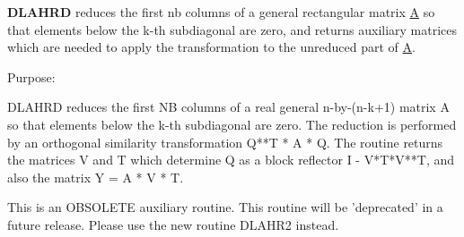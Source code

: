 {\bfseries D\+L\+A\+H\+R\+D} reduces the first nb columns of a general rectangular matrix \hyperlink{classA}{A} so that elements below the k-\/th subdiagonal are zero, and returns auxiliary matrices which are needed to apply the transformation to the unreduced part of \hyperlink{classA}{A}. 

 \begin{DoxyParagraph}{Purpose\+: }
\begin{DoxyVerb} DLAHRD reduces the first NB columns of a real general n-by-(n-k+1)
 matrix A so that elements below the k-th subdiagonal are zero. The
 reduction is performed by an orthogonal similarity transformation
 Q**T * A * Q. The routine returns the matrices V and T which determine
 Q as a block reflector I - V*T*V**T, and also the matrix Y = A * V * T.

 This is an OBSOLETE auxiliary routine. 
 This routine will be 'deprecated' in a  future release.
 Please use the new routine DLAHR2 instead.\end{DoxyVerb}
 
\end{DoxyParagraph}

